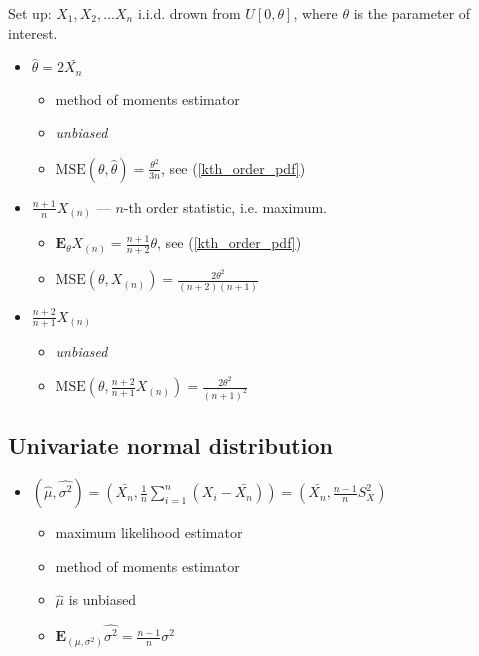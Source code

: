 \documentclass[12pt]{article}
\begin{document}
Set up: $X_1, X_2,\ldots X_n$ i.i.d. drown from $U[0, \theta]$, where $\theta$ is the parameter of interest.

\begin{itemize}
	\item $\hat\theta = 2\bar{X_n}$
	\begin{itemize}
		\item method of moments estimator
		\item \emph{unbiased}
		\item $\text{MSE}(\theta, \hat\theta) = \frac {\theta^2}{3n}$, see (\ref{kth_order_pdf})
	\end{itemize}
	\item $\frac {n+1} n X_{(n)}$ --- $n$-th order statistic, i.e. maximum.
	\begin{itemize}
		\item $\textbf{E}_\theta X_{(n)} = \frac{n+1}{n+2}\theta$, see (\ref{kth_order_pdf})
		\item $\text{MSE}(\theta, X_{(n)}) = \frac {2\theta^2}{(n+2)(n+1)}$
	\end{itemize}
	\item $\frac{n+2}{n+1}X_{(n)}$
	\begin{itemize}
		\item \emph{unbiased}
		\item $\text{MSE}(\theta, \frac{n+2}{n+1}X_{(n)}) = \frac {2\theta^2}{(n+1)^2}$
	\end{itemize}
\end{itemize}

\subsection{Univariate normal distribution}

\begin{itemize}
	\item $\displaystyle{(\hat\mu, \hat{\sigma^2}) = \left(\bar{X_n}, \frac 1 n \sum_{i=1}^n (X_i - \bar{X_n}) \right) = \left(\bar{X_n}, \frac {n-1} n S_X^2 \right)}$
	\begin{itemize}
		\item maximum likelihood estimator
		\item method of moments estimator
		\item $\hat\mu$ is unbiased
		\item $\textbf{E}_{(\mu,\sigma^2)}\hat{\sigma^2} = \frac {n-1} n \sigma^2$

	\end{itemize}

\end{itemize}
\end{document}
